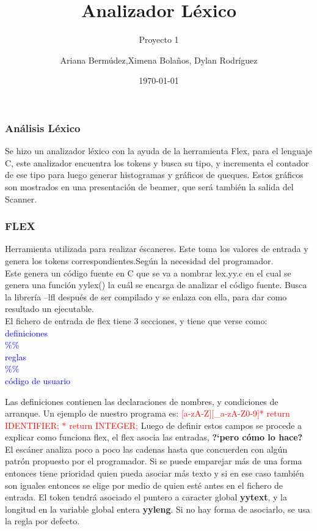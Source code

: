 \documentclass{beamer}
\title{Analizador L\'exico}
\subtitle{Proyecto 1}
\author{Ariana Berm\'udez,Ximena Bola\~nos, Dylan Rodr\'iguez}
\institute{Instituto Tecnol\'ogico de Costa Rica}
\date{\today}
\begin{document}
\begin{frame}
 \titlepage 
 \end{frame}\begin{frame}
 \frametitle{An\'alisis L\'exico}
 Se hizo un analizador l\'exico con la ayuda de la herramienta Flex, para el lenguaje C, este analizador encuentra los tokens y busca su tipo, y incrementa el contador de ese tipo para luego generar histogramas y gr\'aficos de queques. Estos gr\'aficos son mostrados en una presentaci\'on de beamer, que ser\'a tambi\'en la salida del Scanner. \end{frame}\begin{frame}
 \frametitle{FLEX}
 Herramienta utilizada para realizar \'escaneres. Este toma los valores de entrada y genera los tokens correspondientes.Seg\'un la necesidad del programador. \\ Este genera un c\'odigo fuente en C que se va a nombrar lex.yy.c en el cual se genera una funci\'on yylex() la cu\'al se encarga de analizar el c\'odigo fuente. Busca la librer\'ia –lfl después de ser compilado y se enlaza con ella, para dar como resultado un ejecutable. \\ 
 El fichero de entrada de flex tiene 3 secciones, y tiene que verse como:\\ 
 \textcolor{blue}{definiciones \\ \%\% \\ reglas \\ \%\% \\ c\'odigo de usuario} \\ 
\end{frame}
\begin{frame}
Las definiciones contienen las declaraciones de nombres, y condiciones de arranque. Un ejemplo de nuestro programa es: \newline 
\textcolor{red}{[a-zA-Z][\_a-zA-Z0-9]*   return IDENTIFIER; \newline [0-9][0-9]*    return INTEGER;} \newline 
Luego de definir estos campos se procede a explicar como funciona flex, el flex asocia las entradas, \textbf{?`pero c\'omo lo hace?}\newline 
El esc\'aner analiza poco a poco las cadenas hasta que concuerden con alg\'un patr\'on propuesto por el programador. Si se puede emparejar m\'as de una forma entonces tiene prioridad quien pueda asociar m\'as texto y si en ese caso tambi\'en son iguales entonces se elige por medio de quien est\'e antes en el fichero de entrada.\newline 
El token tendr\'a asociado el puntero a caracter global \textbf{yytext}, y la longitud en la variable global entera \textbf{yyleng}. Si no hay forma de asociarlo, se usa la regla por defecto. \newline 
\end{frame}
\end{document}
